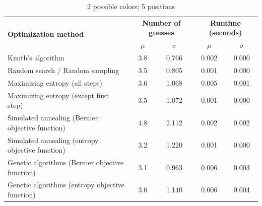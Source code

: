\documentclass[11pt]{article}
\begin{document}
\begin{table}[h!]
\begin{center}
\begin{tabular}{l c c c c}
\toprule
\multirow{2}{*}{\bfseries Optimization method} 		& \multicolumn{2}{c}{\bfseries Number of guesses} 		& \multicolumn{2}{c}{\bfseries Runtime (seconds)}	\\
\cmidrule(lr){2-3}  \cmidrule(lr){4-5}				& $\mu$ & $\sigma$								& $\mu$ & $\sigma$							\\
\cmidrule(lr){1-5}
Knuth's algorithm							& 3.8 & 0.766									& 0.002 & 0.000							\\
Random search / Random sampling				& 3.5 & 0.805									& 0.001 & 0.000							\\
Maximizing entropy (all steps)					& 3.6 & 1.068									& 0.005 & 0.001							\\
Maximizing entropy (except first step)			& 3.5 & 1.072									& 0.001 & 0.000							\\
Simulated annealing (Bernier objective function)	& 4.8 & 2.112									& 0.002 & 0.002							\\
Simulated annealing (entropy objective function)	& 3.2 & 1.220									& 0.001 & 0.000							\\
Genetic algorithms (Bernier objective function)		& 3.1 & 0.963									& 0.006 & 0.003							\\
Genetic algorithms (entropy objective function)		& 3.0 & 1.140									& 0.006 & 0.004							\\
\bottomrule
\end{tabular}
\end{center}
\caption{2 possible colors; 5 positions}
\label{fig:compare_2_5}
\end{table}

\newpage
\end{document}
